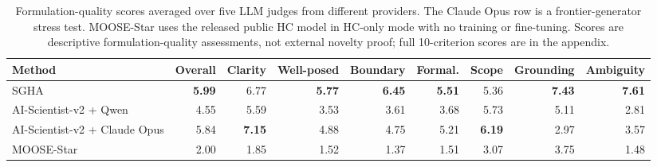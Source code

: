\begin{table}[t]
\centering
\small
\caption{Formulation-quality scores averaged over five LLM judges from different providers. The Claude Opus row is a frontier-generator stress test. MOOSE-Star uses the released public HC model in HC-only mode with no training or fine-tuning. Scores are descriptive formulation-quality assessments, not external novelty proof; full 10-criterion scores are in the appendix.}
\label{tab:formulation_quality_with_moose}
\begin{tabular}{lrrrrrrrr}
\toprule
Method & Overall & Clarity & Well-posed & Boundary & Formal. & Scope & Grounding & Ambiguity \\
\midrule
SGHA & \textbf{5.99} & 6.77 & \textbf{5.77} & \textbf{6.45} & \textbf{5.51} & 5.36 & \textbf{7.43} & \textbf{7.61} \\
AI-Scientist-v2 + Qwen & 4.55 & 5.59 & 3.53 & 3.61 & 3.68 & 5.73 & 5.11 & 2.81 \\
AI-Scientist-v2 + Claude Opus & 5.84 & \textbf{7.15} & 4.88 & 4.75 & 5.21 & \textbf{6.19} & 2.97 & 3.57 \\
MOOSE-Star & 2.00 & 1.85 & 1.52 & 1.37 & 1.51 & 3.07 & 3.75 & 1.48 \\
\bottomrule
\end{tabular}
\end{table}
